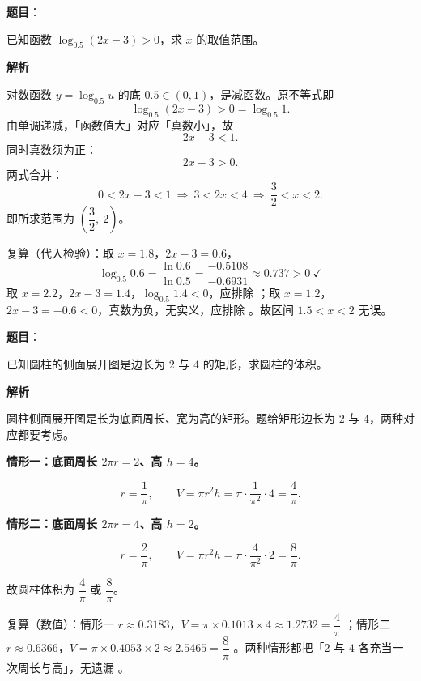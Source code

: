 \begin{answer}

\textbf{题目}：

已知函数 $\log_{0.5}(2x-3)>0$，求 $x$ 的取值范围。

\textbf{解析}

对数函数 $y=\log_{0.5}u$ 的底 $0.5\in(0,1)$，是减函数。原不等式即
\nopagebreak[4]
\[
\log_{0.5}(2x-3)>0=\log_{0.5}1.
\]
由单调递减，「函数值大」对应「真数小」，故
\nopagebreak[4]
\[
2x-3<1.
\]
同时真数须为正：
\nopagebreak[4]
\[
2x-3>0.
\]
两式合并：
\nopagebreak[4]
\[
0<2x-3<1\ \Longrightarrow\ 3<2x<4\ \Longrightarrow\ \frac32<x<2.
\]
即所求范围为 $\left(\dfrac32,\ 2\right)$。

复算（代入检验）：取 $x=1.8$，$2x-3=0.6$，
\nopagebreak[4]
\[
\log_{0.5}0.6=\frac{\ln0.6}{\ln0.5}=\frac{-0.5108}{-0.6931}\approx0.737>0\ \checkmark
\]
取 $x=2.2$，$2x-3=1.4$，$\log_{0.5}1.4<0$，应排除 ；取 $x=1.2$，$2x-3=-0.6<0$，真数为负，无实义，应排除 。故区间 $1.5<x<2$ 无误。


\end{answer}
\begin{answer}

\textbf{题目}：

已知圆柱的侧面展开图是边长为 $2$ 与 $4$ 的矩形，求圆柱的体积。

\textbf{解析}

圆柱侧面展开图是长为底面周长、宽为高的矩形。题给矩形边长为 $2$ 与 $4$，两种对应都要考虑。

\textbf{情形一：底面周长 $2\pi r=2$、高 $h=4$。}

\nopagebreak[4]
\[
r=\frac1\pi,\qquad V=\pi r^2h=\pi\cdot\frac1{\pi^2}\cdot4=\frac4\pi.
\]

\textbf{情形二：底面周长 $2\pi r=4$、高 $h=2$。}

\nopagebreak[4]
\[
r=\frac2\pi,\qquad V=\pi r^2h=\pi\cdot\frac4{\pi^2}\cdot2=\frac8\pi.
\]

故圆柱体积为 $\dfrac4\pi$ 或 $\dfrac8\pi$。

复算（数值）：情形一 $r\approx0.3183$，$V=\pi\times0.1013\times4\approx1.2732=\dfrac4\pi$ ；情形二 $r\approx0.6366$，$V=\pi\times0.4053\times2\approx2.5465=\dfrac8\pi$ 。两种情形都把「$2$ 与 $4$ 各充当一次周长与高」，无遗漏 。


\end{answer}

